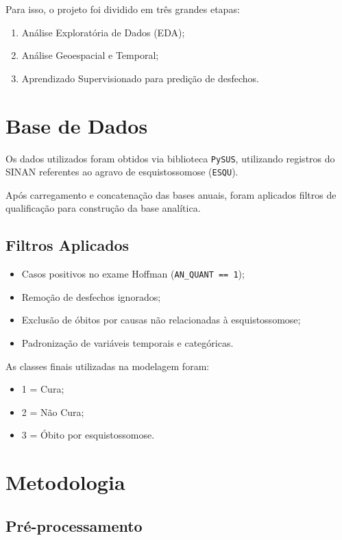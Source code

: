 \documentclass[11pt,a4paper]{article}
\begin{document}
Para isso, o projeto foi dividido em três grandes etapas:

\begin{enumerate}
    \item Análise Exploratória de Dados (EDA);
    \item Análise Geoespacial e Temporal;
    \item Aprendizado Supervisionado para predição de desfechos.
\end{enumerate}

\section{Base de Dados}

Os dados utilizados foram obtidos via biblioteca \texttt{PySUS}, utilizando registros do SINAN referentes ao agravo de esquistossomose (\texttt{ESQU}).

Após carregamento e concatenação das bases anuais, foram aplicados filtros de qualificação para construção da base analítica.

\subsection{Filtros Aplicados}

\begin{itemize}
    \item Casos positivos no exame Hoffman (\texttt{AN\_QUANT == 1});
    \item Remoção de desfechos ignorados;
    \item Exclusão de óbitos por causas não relacionadas à esquistossomose;
    \item Padronização de variáveis temporais e categóricas.
\end{itemize}

As classes finais utilizadas na modelagem foram:

\begin{itemize}
    \item 1 = Cura;
    \item 2 = Não Cura;
    \item 3 = Óbito por esquistossomose.
\end{itemize}

\section{Metodologia}

\subsection{Pré-processamento}
\end{document}
